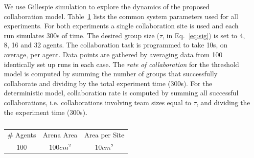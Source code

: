 \documentclass[Main.tex]{subfiles}
\begin{document}
We use Gillespie simulation \cite{gillespie76} to explore the dynamics of the proposed collaboration model.
Table~\ref{tab:params} lists the common system parameters used for all experiments. For both experiments a single collaboration site is used and each run simulates 300s of time. The desired group size ($\tau$, in Eq.~\eqref{eq:sig}) is set to 4, 8, 16 and 32 agents. The collaboration task is programmed to take 10s, on average, per agent. Data points are gathered by averaging data from 100 identically set up runs in each case. The \emph{rate of collaboration} for the threshold model is computed by summing the number of groups that successfully collaborate and dividing by the total experiment time (300s). For the deterministic model, collaboration rate is computed by summing all successful collaborations, i.e. collaborations involving team sizes equal to $\tau$, and dividing the the experiment time (300s).

\begin{table}
\centering\begin{tabular}{|c|c|c|}
\hline
\# Agents & Arena Area & Area per Site\\
100 & $100cm^2$ & $10cm^2$\\
\hline
\end{tabular}
\centering\caption{}\label{tab:params}
\end{table}



\end{document}
